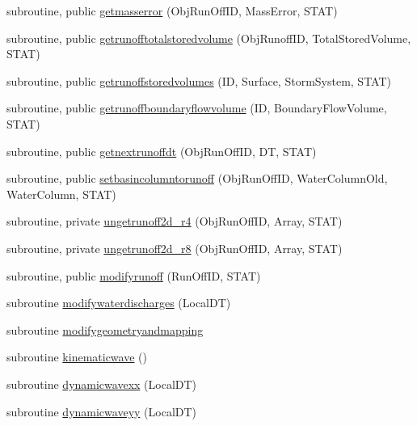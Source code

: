\begin{DoxyCompactItemize}
\item 
subroutine, public \mbox{\hyperlink{namespacemodulerunoff_a9dff5ff4c2ef0ce7078dd08d46ddeb4b}{getmasserror}} (Obj\+Run\+Off\+ID, Mass\+Error, S\+T\+AT)
\item 
subroutine, public \mbox{\hyperlink{namespacemodulerunoff_aa890e5ad105516c116e7c4f53b656bfb}{getrunofftotalstoredvolume}} (Obj\+Runoff\+ID, Total\+Stored\+Volume, S\+T\+AT)
\item 
subroutine, public \mbox{\hyperlink{namespacemodulerunoff_a9d8c0b3cb553adb36c76cde2d6bcaef7}{getrunoffstoredvolumes}} (ID, Surface, Storm\+System, S\+T\+AT)
\item 
subroutine, public \mbox{\hyperlink{namespacemodulerunoff_a3a9224ad169d37f7fdb8eb535513d1b1}{getrunoffboundaryflowvolume}} (ID, Boundary\+Flow\+Volume, S\+T\+AT)
\item 
subroutine, public \mbox{\hyperlink{namespacemodulerunoff_a364cfd3bda8ba61cda13d20f848f20dc}{getnextrunoffdt}} (Obj\+Run\+Off\+ID, DT, S\+T\+AT)
\item 
subroutine, public \mbox{\hyperlink{namespacemodulerunoff_a1bdc99360bd152034690c7eed836b2cf}{setbasincolumntorunoff}} (Obj\+Run\+Off\+ID, Water\+Column\+Old, Water\+Column, S\+T\+AT)
\item 
subroutine, private \mbox{\hyperlink{namespacemodulerunoff_acd023a67da604bbfb903587e80244138}{ungetrunoff2d\+\_\+r4}} (Obj\+Run\+Off\+ID, Array, S\+T\+AT)
\item 
subroutine, private \mbox{\hyperlink{namespacemodulerunoff_af00779fc9a81a3cdf2947f1c7990d1c8}{ungetrunoff2d\+\_\+r8}} (Obj\+Run\+Off\+ID, Array, S\+T\+AT)
\item 
subroutine, public \mbox{\hyperlink{namespacemodulerunoff_a43ce9e041625ab643d74cc279ddf43db}{modifyrunoff}} (Run\+Off\+ID, S\+T\+AT)
\item 
subroutine \mbox{\hyperlink{namespacemodulerunoff_aadda9f593eae7a9fbebc7ae31f4e847b}{modifywaterdischarges}} (Local\+DT)
\item 
subroutine \mbox{\hyperlink{namespacemodulerunoff_a5ae3563ef43601cbe338d999deca7e2b}{modifygeometryandmapping}}
\item 
subroutine \mbox{\hyperlink{namespacemodulerunoff_ac9ce40d4e0d4a7a1faa6f0a7fd6eca2f}{kinematicwave}} ()
\item 
subroutine \mbox{\hyperlink{namespacemodulerunoff_a18db45ec88a4cf69a97c7b95648bc264}{dynamicwavexx}} (Local\+DT)
\item 
subroutine \mbox{\hyperlink{namespacemodulerunoff_a86d4b0ce5f4e6efc7d53702b40d97604}{dynamicwaveyy}} (Local\+DT)

\end{DoxyCompactItemize}
